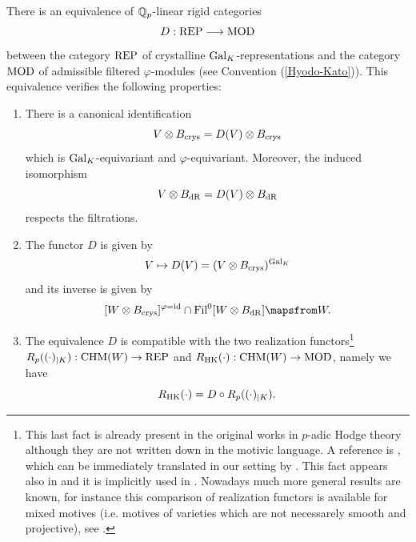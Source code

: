 \begin{theorem}
\notready\label{tsuji}
There is an  equivalence of $\mathbb{Q}_p$-linear rigid categories
\[D : \textnormal{REP} \longrightarrow \textnormal{MOD}\]
between the category $\textnormal{REP}$  of crystalline  $\textnormal{Gal}_K$-representations and the category $\textnormal{MOD}$ of admissible filtered $\varphi$-modules (see Convention (\ref{Hyodo-Kato})). This equivalence verifies the following properties:
\begin{enumerate}
\item\label{tsujican} There is a canonical identification
\[ V \otimes B_{\textnormal{crys}}=  D(V)\otimes B_{\textnormal{crys}} \]
which is $\textnormal{Gal}_K$-equivariant and $\varphi$-equivariant. Moreover, the induced isomorphism
\[ V \otimes B_{\mathrm{dR}}=  D(V)\otimes B_{\mathrm{dR}} \]
respects the filtrations.

\item The functor $D$ is given by
\[V \mapsto D(V)= (V \otimes B_{\textnormal{crys}})^{\textnormal{Gal}_K}\]
and its inverse is given by
\[ [W\otimes B_\crys]^{\varphi=\id} \cap  \Fil^0[W \otimes B_\dR] \mapsfrom W.\]

\item The equivalence $D$  is compatible with the two realization functors\footnote{This last fact is already present in the original works in $p$-adic Hodge theory although they are not written down in the motivic language. A reference is
\cite[Theorem 1.2]{Niziol}, which can be immediately translated in our setting by  \cite[Proposition 4.2.5.1]{Andmot}.   This fact appears also in \cite[3.4.5]{Andmot} and it is implicitly  used in   \cite[7.4.1]{Andmot}. Nowadays much more general results are known, for instance this comparison of realization functors is available for mixed motives (i.e. motives of varieties which are not necessarely smooth and projective), see \cite[4.15]{NiziFred}.}
$R_p ((\cdot)_{\vert K}): \mathrm{CHM}(W) \rightarrow \textnormal{REP}$   and $R_{\mathrm{HK}} (\cdot): \mathrm{CHM}(W)\rightarrow \textnormal{MOD}$, namely we have
\[R_{\mathrm{HK}} (\cdot) = D \circ R_p ((\cdot)_{\vert K}).\]
\end{enumerate}
\end{theorem}
